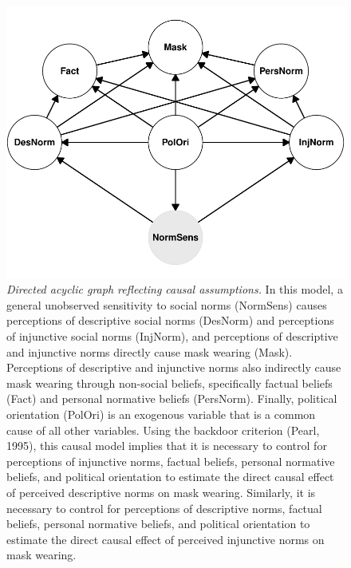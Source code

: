 \documentclass[
  man, donotrepeattitle,floatsintext]{apa6}
\begin{document}
\begin{figure}
\centering
\includegraphics{manuscript_files/figure-latex/plotDAG-1.pdf}
\caption{\label{fig:plotDAG}\emph{Directed acyclic graph reflecting causal assumptions.} In this model, a general unobserved sensitivity to social norms (NormSens) causes perceptions of descriptive social norms (DesNorm) and perceptions of injunctive social norms (InjNorm), and perceptions of descriptive and injunctive norms directly cause mask wearing (Mask). Perceptions of descriptive and injunctive norms also indirectly cause mask wearing through non-social beliefs, specifically factual beliefs (Fact) and personal normative beliefs (PersNorm). Finally, political orientation (PolOri) is an exogenous variable that is a common cause of all other variables. Using the backdoor criterion (Pearl, 1995), this causal model implies that it is necessary to control for perceptions of injunctive norms, factual beliefs, personal normative beliefs, and political orientation to estimate the direct causal effect of perceived descriptive norms on mask wearing. Similarly, it is necessary to control for perceptions of descriptive norms, factual beliefs, personal normative beliefs, and political orientation to estimate the direct causal effect of perceived injunctive norms on mask wearing.}
\end{figure}

\newpage
\end{document}
